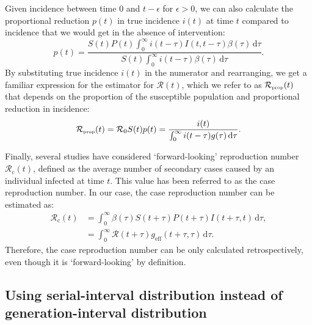 \documentclass[12pt]{article}
\newcommand{\Rx}[1]{\ensuremath{{\mathcal R}_{#1}}\xspace}
\newcommand{\Ro}{\Rx{0}}
\newcommand{\Rc}{\Rx{\mathrm{c}}}
\newcommand{\RR}{\ensuremath{{\mathcal R}}\xspace}
\newcommand{\tsub}[2]{#1_{{\textrm{\tiny #2}}}}
\newcommand{\dd}[1]{\ensuremath{\, \mathrm{d}#1}}
\newcommand{\dtau}{\dd{\tau}}
\newcommand{\geff}{g_{\textrm{eff}}} %
\begin{document}
Given incidence between time $0$ and $t-\epsilon$ for $\epsilon > 0$, we can also calculate the proportional reduction $p(t)$ in true incidence $i(t)$ at time $t$ compared to incidence that we would get in the absence of intervention:
\begin{equation}
p(t) = \frac{S(t) P(t) \int_0^\infty i(t-\tau) I(t,t-\tau) \beta(\tau) \dtau}{S(t) \int_0^\infty i(t-\tau) \beta(\tau) \dtau}.
\end{equation}
By substituting true incidence $i(t)$ in the numerator and rearranging, we get a familiar expression for the estimator for $\RR(t)$, which we refer to as $\tsub{\RR}{prop}(t)$ that depends on the proportion of the susceptible population and proportional reduction in incidence:
\begin{equation}
\tsub{\RR}{prop}(t) = \Ro S(t) p(t) = \frac{i(t)}{\int_0^\infty i(t-\tau) g(\tau) \dtau}.
\end{equation}

Finally, several studies have considered `forward-looking' reproduction number $\Rc(t)$, defined as the average number of secondary cases caused by an individual infected at time $t$.
This value has been referred to as the case reproduction number.
In our case, the case reproduction number can be estimated as:
\begin{equation}
\begin{aligned}
\Rc(t) &= \int_0^\infty \beta(\tau) S(t+\tau) P(t+\tau) I(t+\tau, t) \dtau,\\
&= \int_0^\infty \RR(t+\tau) \geff(t+\tau, \tau) \dtau.
\end{aligned}
\end{equation}
Therefore, the case reproduction number can be only calculated retrospectively, even though it is `forward-looking' by definition.

\subsection{Using serial-interval distribution instead of generation-interval distribution}
\end{document}
